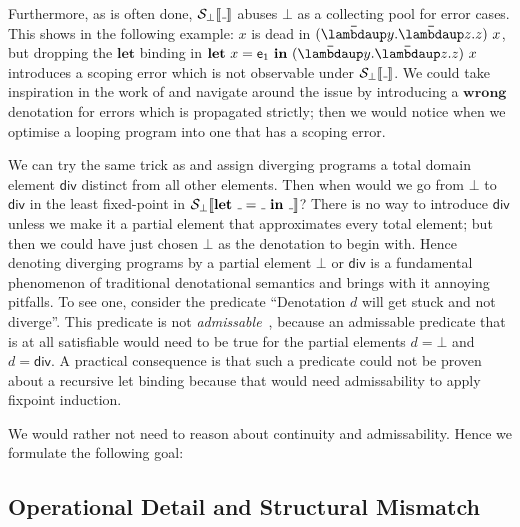 Furthermore, as is often done, $\semscott{\wild}$ abuses $\bot$ as a collecting
pool for error cases.
This shows in the following example:
$x$ is dead in $(\Lam{y}{\Lam{z}{z}})~x$, but dropping the $\mathbf{let}$
binding in $\Let{x}{\pe_1}{(\Lam{y}{\Lam{z}{z}})~x}$
introduces a scoping error which is not observable under $\semscott{\wild}$.
We could take inspiration in the work of \citet{Milner:78}
and navigate around the issue by introducing a $\mathbf{wrong}$ denotation for
errors which is propagated strictly; then we would notice when we optimise a
looping program into one that has a scoping error.

We can try the same trick as \citeauthor{Milner:78} and assign diverging
programs a total domain element $\mathsf{div}$ distinct from all other elements.
Then when would we go from $\bot$ to $\mathsf{div}$ in the least fixed-point in
$\semscott{\Let{\wild}{\wild}{\wild}}$?
There is no way to introduce $\mathsf{div}$ unless we make it a partial element
that approximates every total element; but then we could have just chosen $\bot$
as the denotation to begin with.
Hence denoting diverging programs by a partial element $\bot$ or $\mathsf{div}$
is a fundamental phenomenon of traditional denotational semantics and brings
with it annoying pitfalls.
To see one, consider the predicate ``Denotation $d$ will get stuck and not
diverge''.
This predicate is not \emph{admissable}~\citep{Abramsky:94}, because an
admissable predicate that is at all satisfiable would need to be true for
the partial elements $d=\bot$ and $d=\mathsf{div}$.
A practical consequence is that such a predicate could not be proven about a
recursive let binding because that would need admissability to apply fixpoint
induction.

We would rather not need to reason about continuity and admissability.
Hence we formulate the following goal:


\subsection{Operational Detail and Structural Mismatch}

